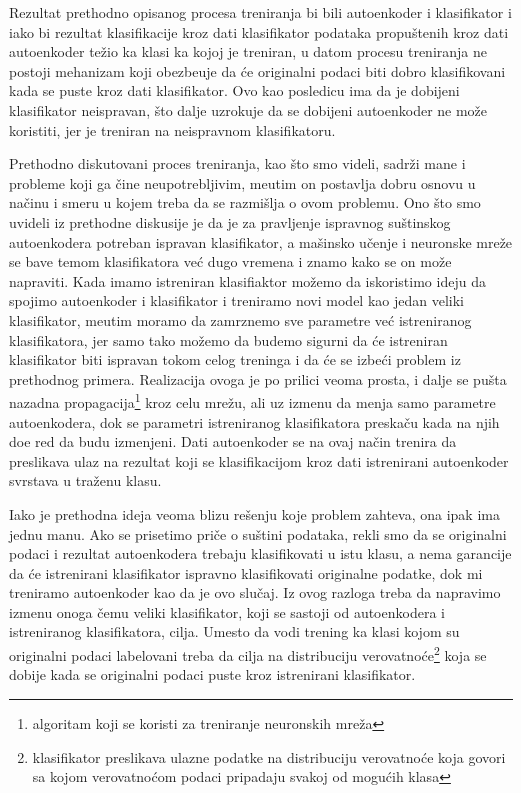 \documentclass{article}
\begin{document}
	Rezultat prethodno opisanog procesa treniranja bi bili autoenkoder i klasifikator i iako bi rezultat klasifikacije kroz dati klasifikator podataka propu\v stenih kroz dati autoenkoder te\v zio ka klasi ka kojoj je treniran, u datom procesu treniranja ne postoji mehanizam koji obezbe\dj uje da \'ce originalni podaci biti dobro klasifikovani kada se puste kroz dati klasifikator.
	Ovo kao posledicu ima da je dobijeni klasifikator neispravan, \v sto dalje uzrokuje da se dobijeni autoenkoder ne mo\v ze koristiti, jer je treniran na neispravnom klasifikatoru.
	
	Prethodno diskutovani proces treniranja, kao \v sto smo videli, sadr\v zi mane i probleme koji ga \v cine neupotrebljivim, me\dj utim on postavlja dobru osnovu u na\v cinu i smeru u kojem treba da se razmi\v slja o ovom problemu.
	Ono \v sto smo uvideli iz prethodne diskusije je da je za pravljenje ispravnog su\v stinskog autoenkodera potreban ispravan klasifikator, a ma\v sinsko u\v cenje i neuronske mre\v ze se bave temom klasifikatora ve\'c dugo vremena i znamo kako se on mo\v ze napraviti.
	Kada imamo istreniran klasifiaktor mo\v zemo da iskoristimo ideju da spojimo autoenkoder i klasifikator i treniramo novi model kao jedan veliki klasifikator, me\dj utim moramo da zamrznemo sve parametre ve\'c istreniranog klasifikatora, jer samo tako mo\v zemo da budemo sigurni da \'ce istreniran klasifikator biti ispravan tokom celog treninga i da \'ce se izbe\'ci problem iz prethodnog primera.
	Realizacija ovoga je po prilici veoma prosta, i dalje se pu\v sta nazadna propagacija\footnote{algoritam koji se koristi za treniranje neuronskih mre\v za} kroz celu mre\v zu, ali uz izmenu da menja samo parametre autoenkodera, dok se parametri istreniranog klasifikatora preska\v cu kada na njih do\dj e red da budu izmenjeni.
	Dati autoenkoder se na ovaj na\v cin trenira da preslikava ulaz na rezultat koji se klasifikacijom kroz dati istrenirani autoenkoder svrstava u tra\v zenu klasu.
	
	Iako je prethodna ideja veoma blizu re\v senju koje problem zahteva, ona ipak ima jednu manu. 
	Ako se prisetimo pri\v ce o su\v stini podataka, rekli smo da se originalni podaci i rezultat autoenkodera trebaju klasifikovati u istu klasu, a nema garancije da \'ce istrenirani klasifikator ispravno klasifikovati originalne podatke, dok mi treniramo autoenkoder kao da je ovo slu\v caj.
	Iz ovog razloga treba da napravimo izmenu onoga \v cemu veliki klasifikator, koji se sastoji od autoenkodera i istreniranog klasifikatora, cilja.
	Umesto da vodi trening ka klasi kojom su originalni podaci labelovani treba da cilja na distribuciju verovatno\'ce\footnote{klasifikator preslikava ulazne podatke na distribuciju verovatno\'ce koja govori sa kojom verovatno\'com podaci pripadaju svakoj od mogu\'cih klasa} koja se dobije kada se originalni podaci puste kroz istrenirani klasifikator.
	
\end{document}
